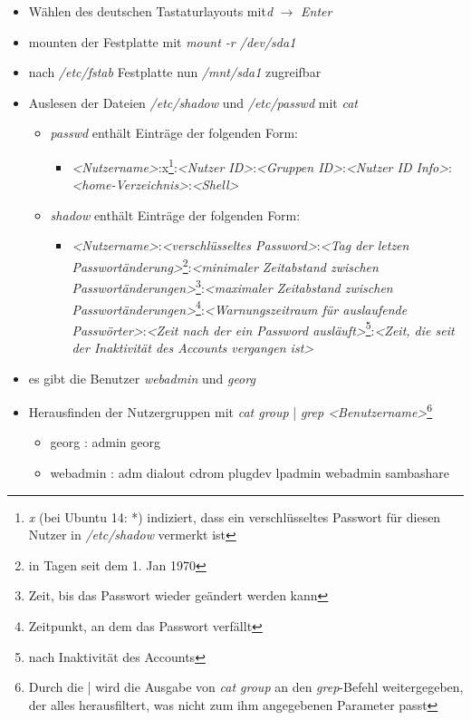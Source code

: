\documentclass[twoside]{article}
\newcommand{\tit}[1]{\textit{#1}}
\begin{document}
\begin{itemize}
	\item Wählen des deutschen Tastaturlayouts mit\tit{d} $\rightarrow$ \tit{Enter}
	\item mounten der Festplatte mit \tit{mount -r /dev/sda1}
	\item nach \tit{/etc/fstab} Festplatte nun \tit{/mnt/sda1} zugreifbar
	\item Auslesen der Dateien \tit{/etc/shadow} und \tit{/etc/passwd} mit \tit{cat}
	\begin{itemize}
		\item \tit{passwd} enthält Einträge der folgenden Form: \cite{1}
		\begin{itemize}
			\item \tit{<Nutzername>}:x\footnote{\tit{x} (bei Ubuntu 14: *) indiziert, dass ein verschlüsseltes Passwort für diesen Nutzer in \tit{/etc/shadow} vermerkt ist}:\tit{<Nutzer ID>}:\tit{<Gruppen ID>}:\tit{<Nutzer ID Info>}:\tit{<home-Verzeichnis>}:\tit{<Shell>}
		\end{itemize}
		\item \tit{shadow} enthält Einträge der folgenden Form: \cite{2}
		\begin{itemize}
			\item \tit{<Nutzername>}:\tit{<verschlüsseltes Password>}:\tit{<Tag der letzen Passwortänderung>}\footnote{in Tagen seit dem 1. Jan 1970}:\tit{<minimaler Zeitabstand zwischen Passwortänderungen>}\footnote{Zeit, bis das Passwort wieder geändert werden kann}:\tit{<maximaler Zeitabstand zwischen Passwortänderungen>}\footnote{Zeitpunkt, an dem das Passwort verfällt}:\tit{<Warnungszeitraum für auslaufende Passwörter>}:\tit{<Zeit nach der ein Password ausläuft>}\footnote{nach Inaktivität des Accounts}:\tit{<Zeit, die seit der Inaktivität des Accounts vergangen ist>}
		\end{itemize}
	\end{itemize}
	\item es gibt die Benutzer \tit{webadmin} und \tit{georg}
	\item Herausfinden der Nutzergruppen mit \tit{cat group} | \tit{grep <Benutzername>}\footnote{Durch die | wird die Ausgabe von \tit{cat group} an den \tit{grep}-Befehl weitergegeben, der alles herausfiltert, was nicht zum ihm angegebenen Parameter passt}
	\begin{itemize}
		\item georg : admin georg 
		\item webadmin : adm dialout cdrom plugdev lpadmin webadmin sambashare
	\end{itemize}
\end{itemize}
\end{document}
